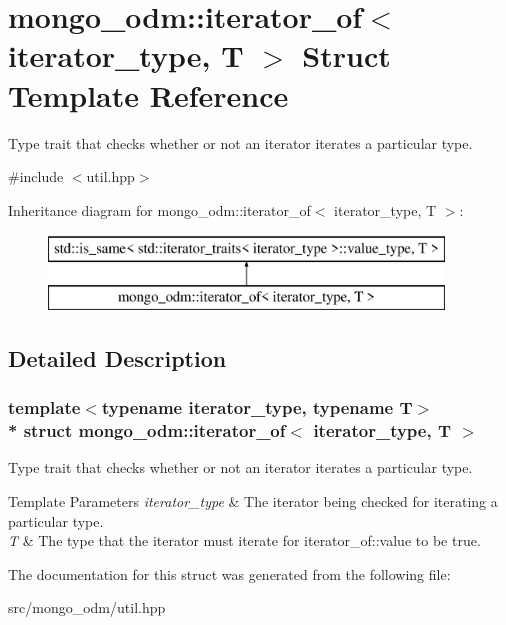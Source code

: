 \hypertarget{structmongo__odm_1_1iterator__of}{}\section{mongo\+\_\+odm\+:\+:iterator\+\_\+of$<$ iterator\+\_\+type, T $>$ Struct Template Reference}
\label{structmongo__odm_1_1iterator__of}


Type trait that checks whether or not an iterator iterates a particular type.  




{\ttfamily \#include $<$util.\+hpp$>$}

Inheritance diagram for mongo\+\_\+odm\+:\+:iterator\+\_\+of$<$ iterator\+\_\+type, T $>$\+:\begin{figure}[H]
\begin{center}
\leavevmode
\includegraphics[height=2.000000cm]{structmongo__odm_1_1iterator__of}
\end{center}
\end{figure}


\subsection{Detailed Description}
\subsubsection*{template$<$typename iterator\+\_\+type, typename T$>$\\*
struct mongo\+\_\+odm\+::iterator\+\_\+of$<$ iterator\+\_\+type, T $>$}

Type trait that checks whether or not an iterator iterates a particular type. 


\begin{DoxyTemplParams}{Template Parameters}
{\em iterator\+\_\+type} & The iterator being checked for iterating a particular type. \\
\hline
{\em T} & The type that the iterator must iterate for iterator\+\_\+of\+::value to be true. \\
\hline
\end{DoxyTemplParams}


The documentation for this struct was generated from the following file\+:\begin{DoxyCompactItemize}
\item 
src/mongo\+\_\+odm/util.\+hpp\end{DoxyCompactItemize}
